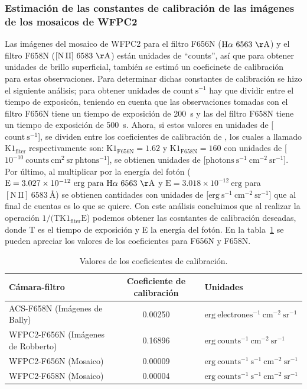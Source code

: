 \documentclass{article}
\newcommand\ha{\ensuremath{\mathrm{H}\alpha}}
\newcommand\nii{\ensuremath{\mathrm{[N\,II]}}}
\newcommand\A{\ensuremath{\text{\AA{}}}}
\begin{document}
\subsubsection{Estimación de las  constantes de calibración de las imágenes de los mosaicos de WFPC2}
\label{sec:wpfc2}
Las imágenes del mosaico de WFPC2 para el filtro F656N (\(\mathrm{\ha~6563~\AA{}}\)) y el filtro F658N (\(\mathrm{\nii~6583~\AA{}}\)) están unidades de ``counts'', así que para obtener unidades de brillo superficial, también se estimó un coeficinete de calibración para estas observaciones. Para determinar dichas constantes de calibración se hizo el siguiente análisis; para obtener unidades de \(\mathrm{count~s^{-1}}\) hay que  dividir entre el tiempo de exposicón, teniendo en cuenta que las observaciones tomadas con el filtro F656N tiene un tiempo de exposición de 200~s y las del filtro F658N tiene un tiempo de exposición de 500~s. Ahora, si estos valores en unidades de [\(\mathrm{count~s^{-1}}\)], se dividen entre los coeficientes de calibración de \citet{Odell:2009}, los cuales a llamado \(\mathrm{K1_{fiter}}\)  respectivamente son: \(\mathrm{K1_{F656N} = 1.62}\) y \(\mathrm{K1_{F658N} = 160}\) con unidades de [\(\mathrm{10^{-10}~counts~cm^{2}~sr~phtons^{-1}}\)], se obtienen unidades de [\(\mathrm{photons~s^{-1}~cm^{-2}~sr^{-1}}\)]. Por último, al multiplicar por la energía del fotón (\(\mathrm{E=3.027\times 10^{-12}~erg~para~\ha{}~6563~\AA{}}\) y \(\mathrm{E=3.018 \times10^{-12}~erg}\) para \(\nii{}~6583~\A{}\)) se obtienen cantidades con unidades de [\(\mathrm{erg~s^{-1}~cm^{-2}~sr^{-1}}\)] que al final de cuentas es lo que se quiere.  Con este análisis concluimos que al realizar la operación \(1/(\mathrm{TK1_{fiter}E}\))  podemos obtener las cosntantes de calibración deseadas, donde T es el tiempo de exposición y E la energía del fotón. En la tabla~\ref{tab:table-constans} se pueden apreciar los valores de los coeficientes para F656N y F658N. 
  
\begin{table}[htp]
\centering
\begin{tabular}{ |l| |c| |l| }
\hline
Cámara-filtro&                       Coeficiente de calibración&       Unidades\\ \hline 
ACS-F658N (Imágenes de Bally)&       0.00250 &                          \(\mathrm{erg~electrones^{-1}~cm^{-2}~sr^{-1}}\)\\
WFPC2-F656N (Imágenes de Robberto)&  0.16896 &                          \(\mathrm{erg~counts^{-1}~cm^{-2}~sr^{-1}}\)\\
WFPC2-F656N (Mosaico)&               0.00009 &                          \(\mathrm{erg~counts^{-1}~s^{-1}~cm^{-2}~sr^{-1}}\)\\
WFPC2-F658N (Mosaico)&               0.00004 &                          \(\mathrm{erg~counts^{-1}~s^{-1}~cm^{-2}~sr^{-1}}\)\\ 
\hline
 \end{tabular} 
 \caption{Valores de los coeficientes de calibración.}
  \label{tab:table-constans}
\end{table}
\normalsize
\end{document}
